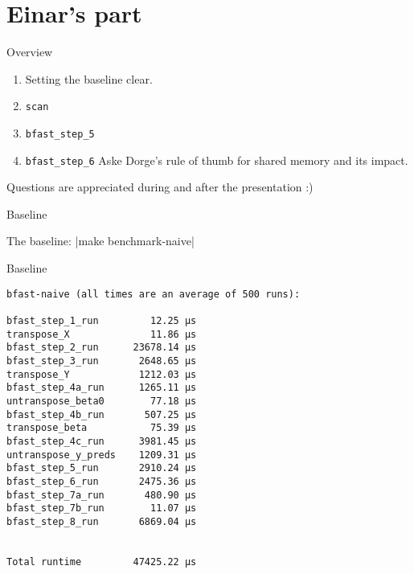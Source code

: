\section{Einar's part}

\begin{frame}[fragile]{Overview}
\begin{enumerate}
    \item Setting the baseline clear.
    \item \texttt{scan}
    \item \texttt{bfast\_step\_5}
    \item \texttt{bfast\_step\_6} Aske Dorge's rule of thumb for shared
        memory and its impact.
\end{enumerate}
    \pause
Questions are appreciated during and after the presentation :)
\end{frame}


\begin{frame}[fragile]{Baseline}

The baseline: |make benchmark-naive|
\end{frame}

\begin{frame}[fragile]{Baseline}
    \centering
    \begin{verbatim}
bfast-naive (all times are an average of 500 runs):

bfast_step_1_run         12.25 µs
transpose_X              11.86 µs
bfast_step_2_run      23678.14 µs
bfast_step_3_run       2648.65 µs
transpose_Y            1212.03 µs
bfast_step_4a_run      1265.11 µs
untranspose_beta0        77.18 µs
bfast_step_4b_run       507.25 µs
transpose_beta           75.39 µs
bfast_step_4c_run      3981.45 µs
untranspose_y_preds    1209.31 µs
bfast_step_5_run       2910.24 µs
bfast_step_6_run       2475.36 µs
bfast_step_7a_run       480.90 µs
bfast_step_7b_run        11.07 µs
bfast_step_8_run       6869.04 µs


Total runtime         47425.22 µs
\end{verbatim}

\end{frame}

